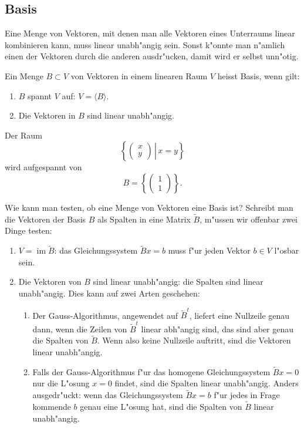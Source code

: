 \subsection{Basis}
Eine Menge von Vektoren, mit denen man alle Vektoren eines Unterraums
linear kombinieren kann, muss linear unabh"angig sein.
Sonst k"onnte
man n"amlich einen der Vektoren durch die anderen ausdr"ucken, damit
wird er selbst unn"otig.

\begin{definition}
Ein Menge $B\subset V$ von Vektoren in einem linearen Raum $V$ heisst
Basis, wenn gilt:
\begin{enumerate}
\item $B$ spannt $V$ auf: $V=\langle B\rangle$.
\item Die Vektoren in $B$ sind linear unabh"angig.
\end{enumerate}
\end{definition}

\begin{beispiel}
Der Raum
\[
\left\{\left.\begin{pmatrix}x\\y\end{pmatrix}\,\right|\, x=y\right\}
\]
wird aufgespannt von 
\[
B=\left\{\begin{pmatrix}1\\1\end{pmatrix}\right\}.
\]
\end{beispiel}

Wie kann man testen, ob eine Menge von Vektoren eine Basis ist?
Schreibt man die Vektoren der Basis $B$ als Spalten in eine Matrix
$\tilde B$, m"ussen wir offenbar zwei Dinge testen:
\begin{enumerate}
\item $V = \operatorname{im}\tilde B$: das Gleichungssystem $\tilde Bx=b$
muss f"ur jeden Vektor $b\in V$ l"osbar sein.
\item Die Vektoren von $B$ sind linear unabh"angig: die Spalten sind
linear unabh"angig.
Dies kann auf zwei Arten geschehen:
\begin{enumerate}
\item Der Gauss-Algorithmus, angewendet auf $\tilde B^t$, liefert eine
Nullzeile genau dann, wenn die Zeilen von $\tilde B^t$ linear abh"angig sind,
das sind aber genau die Spalten von $\tilde B$.
Wenn also keine Nullzeile
auftritt, sind die Vektoren linear unabh"angig.
\item Falls der Gauss-Algorithmus f"ur das homogene Gleichungssystem
$\tilde B x=0$ nur die L"osung $x=0$ findet, sind die Spalten linear
unabh"angig.
Anders ausgedr"uckt: wenn das Gleichungssystem $\tilde Bx=b$
f"ur jedes in Frage kommende $b$ genau eine L"osung hat, sind die
Spalten von $\tilde B$ linear unabh"angig.
\end{enumerate}
\end{enumerate}



